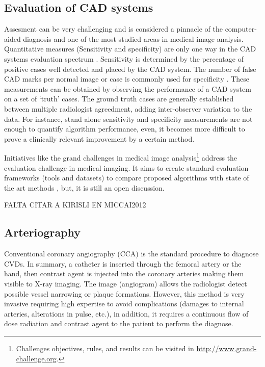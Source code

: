 \subsection{Evaluation of CAD systems}

Assesment can be very challenging and is considered a pinnacle of the computer-aided diagnosis and one of the most studied areas in medical image analysis. Quantitative measures (Sensitivity and specificity) are only one way in the CAD systems evaluation spectrum \citep{Ginneken2011}. Sensitivity is determined by the percentage of positive cases well detected and placed by the CAD system. The number of false CAD marks per normal image or case is commonly used for specificity \citep{Castellino2005}. These measurements can be obtained by observing the performance of a CAD system on a set of ‘truth’ cases. The ground truth cases are generally established between multiple radiologist agreedment, adding inter-observer variation to the data. For instance, stand alone sensitivity and specificity measurements are not enough to quantify algorithm performance, even, it becomes more difficult to prove a clinically relevant improvement by a certain method. 

Initiatives like the grand challenges in medical image analysis\footnote{Challenges objectives, rules, and results can be visited in \href{http://www.grand-challenge.org}{http://www.grand-challenge.org}.} address the evaluation challenge in medical imaging. It aims to create standard evaluation frameworks (tools and datasets) to compare proposed algorithms with state of the art methods \citep{Hameeteman2011, Schaap2009} , but, it is still an open discussion.

FALTA CITAR A KIRISLI EN MICCAI2012

\subsection{Arteriography}

Conventional coronary angiography (CCA) is the standard procedure to diagnose CVDs. In summary, a catheter is inserted through the femoral artery or the hand, then contrast agent is injected into the coronary arteries making them visible to X-ray imaging. The image (angiogram) allows the radiologist detect possible vessel narrowing or plaque formations. However, this method is very invasive requiring high expertise to avoid complications (damages to internal arteries, alterations in pulse, etc.), in addition, it requires a continuous flow of dose radiation and contrast agent to the patient to perform the diagnose.

